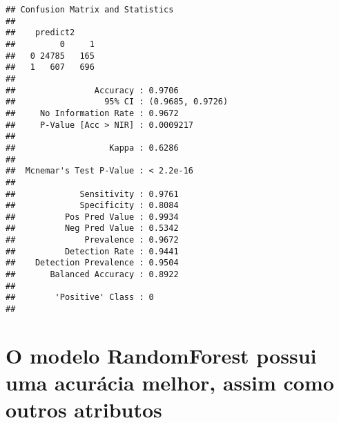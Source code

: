 \documentclass[
]{article}
\newenvironment{Shaded}{\begin{snugshade}}{\end{snugshade}}
\newcommand{\AttributeTok}[1]{\textcolor[rgb]{0.77,0.63,0.00}{#1}}
\newcommand{\FunctionTok}[1]{\textcolor[rgb]{0.00,0.00,0.00}{#1}}
\newcommand{\NormalTok}[1]{#1}
\newcommand{\OtherTok}[1]{\textcolor[rgb]{0.56,0.35,0.01}{#1}}
\newcommand{\SpecialCharTok}[1]{\textcolor[rgb]{0.00,0.00,0.00}{#1}}
\begin{document}
\begin{Shaded}
\end{Shaded}

\begin{verbatim}
## Confusion Matrix and Statistics
## 
##    predict2
##         0     1
##   0 24785   165
##   1   607   696
##                                           
##                Accuracy : 0.9706          
##                  95% CI : (0.9685, 0.9726)
##     No Information Rate : 0.9672          
##     P-Value [Acc > NIR] : 0.0009217       
##                                           
##                   Kappa : 0.6286          
##                                           
##  Mcnemar's Test P-Value : < 2.2e-16       
##                                           
##             Sensitivity : 0.9761          
##             Specificity : 0.8084          
##          Pos Pred Value : 0.9934          
##          Neg Pred Value : 0.5342          
##              Prevalence : 0.9672          
##          Detection Rate : 0.9441          
##    Detection Prevalence : 0.9504          
##       Balanced Accuracy : 0.8922          
##                                           
##        'Positive' Class : 0               
## 
\end{verbatim}

\hypertarget{o-modelo-randomforest-possui-uma-acuruxe1cia-melhor-assim-como-outros-atributos}{%
\section{O modelo RandomForest possui uma acurácia melhor, assim como
outros
atributos}\label{o-modelo-randomforest-possui-uma-acuruxe1cia-melhor-assim-como-outros-atributos}}
\end{document}
